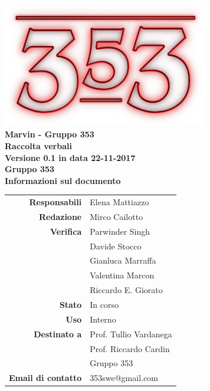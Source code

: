 \documentclass[openany, a4paper, 12pt]{report}
\begin{document}
\begin{titlepage}
	\centering
	\vfill
	{
		\bfseries
		\vskip2cm
		\includegraphics[width=9cm]{../../common/images/logo.png} \\
		\Large Marvin - Gruppo 353\\
		\vfill
		\Huge Raccolta verbali\\
		\Large Versione 0.1 in data 22-11-2017\\
		\vfill
		\large Gruppo 353\\
		\vfill
	\normalsize Informazioni sul documento\\
\begin{table}[htbp]
	\centering
	\renewcommand\arraystretch{1.2}
	\begin{tabular}{r|l}
		\hline
		\textbf{Responsabili}	& Elena Mattiazzo\\
		
		\textbf{Redazione} 		& Mirco Cailotto\\
		
		\textbf{Verifica} 		& Parwinder Singh\\
								& Davide Stocco\\
								& Gianluca Marraffa\\
								& Valentina Marcon\\
								& Riccardo E. Giorato\\
						
		\textbf{Stato} 			& In corso\\
		\textbf{Uso}			& Interno\\
		\textbf{Destinato a}   	& Prof. Tullio Vardanega\\
								& Prof. Riccardo Cardin\\
								& Gruppo 353\\
		
						
		\textbf{Email di contatto}	& 353swe@gmail.com
	\end{tabular}
\end{table}
		\vfill
	}    
\end{titlepage}

\tableofcontents
\newpage
{}

 
\end{document}
